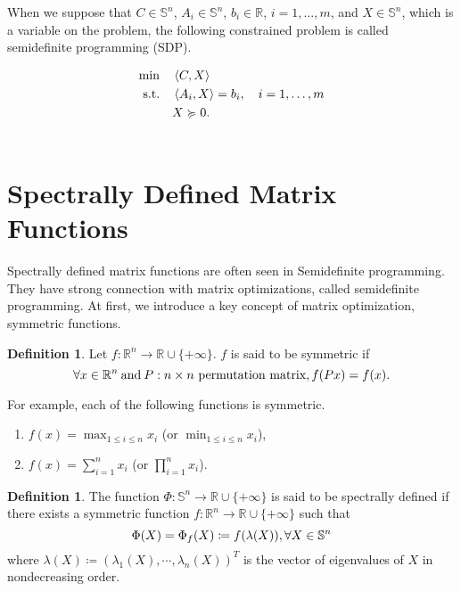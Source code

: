 \documentclass[a4paper,11pt, oneside]{book}
\theoremstyle{definition}
\newtheorem{dfn}[thm]{Definition}
\newcommand{\RealNumberSet}{\mathbb{R}}
\newcommand{\NDemenstionalRealEuclideanSpace}{\mathbb{R}^n}
\newcommand{\NDemenstionalRealSymmetricMatrixSpace}{\mathbb{S}^n}
\newcommand{\InnerProduct}[2]{\left\langle {#1},{#2}\right\rangle} %
\newcommand{\ExtendedRealValuedFunction}[2]{{#1}: {#2} \to \RealNumberSet \cup \{+\infty\}}
\begin{document}
When we suppose that $C \in \NDemenstionalRealSymmetricMatrixSpace$, $A_i \in \NDemenstionalRealSymmetricMatrixSpace$, $b_i \in \RealNumberSet$, $i = 1,\dots,m$, and $X \in \NDemenstionalRealSymmetricMatrixSpace$, which is a variable on the problem, the following constrained problem is called semidefinite programming (SDP).

\begin{equation}
  \begin{aligned}
  \min \quad & \InnerProduct{C}{X}\\
  \textrm{s.t.} \quad & \InnerProduct{A_i}{X} = b_i, \quad i = 1,\dots,m\\
    & X \succcurlyeq 0. \\ \notag
  \end{aligned}
\end{equation}
\section{Spectrally Defined Matrix Functions}

Spectrally defined matrix functions are often seen in Semidefinite programming. They have strong connection with matrix optimizations, called semidefinite programming. At first, we introduce a key concept of matrix optimization, symmetric functions.

\begin{dfn}
  Let $\ExtendedRealValuedFunction{f}{\NDemenstionalRealEuclideanSpace}$.
  $f$ is said to be symmetric if
  \begin{equation}
    \forall x \in \NDemenstionalRealEuclideanSpace \:\text{and}\: P: n \times n \text{ permutation matrix}, f(Px) = f(x). \notag
  \end{equation}
\end{dfn}
For example, each of the following functions is symmetric.
\begin{enumerate}[label=\roman*,align=CenterWithParen]
  \item $f(x) = \max_{1 \leq i \leq n} x_i$ (or $\min_{1 \leq i \leq n} x_i$),
  \item $f(x) = \sum_{i = 1}^{n} x_i$ (or $\prod_{i = 1}^{n} x_i$).
\end{enumerate}

\begin{dfn}
  The function $\ExtendedRealValuedFunction{\Phi}{\NDemenstionalRealSymmetricMatrixSpace}$ is said to be spectrally defined if there exists a symmetric function $\ExtendedRealValuedFunction{f}{\NDemenstionalRealEuclideanSpace}$ such that
  \begin{equation}
    \Phi (X) = \Phi_{f}(X) \coloneqq f(\lambda (X)), \forall X \in \NDemenstionalRealSymmetricMatrixSpace \notag
  \end{equation}
  where $\lambda (X) \coloneqq (\lambda_1 (X), \dotsb , \lambda_n (X))^T$ is the vector of eigenvalues of $X$ in nondecreasing order.
\end{dfn}
\end{document}
